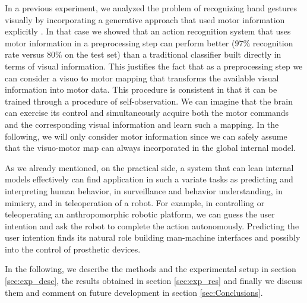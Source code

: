 In a previous experiment, we analyzed the problem of recognizing hand gestures visually
by incorporating a generative approach that used motor information explicitly 
\cite{lopes-05,metta-06}.
In that case we showed that an action recognition system that uses motor information in
a preprocessing step can perform better ($97\%$ recognition rate versus $80\%$ on the test
set) than a traditional classifier built directly in terms of visual information. This 
justifies the fact that as a preprocessing step we can consider a visuo to motor mapping that 
transforms the available visual information into motor data. This procedure is consistent 
in that it can be trained through a procedure of self-observation. We can imagine that 
the brain can exercise its control and simultaneously acquire both the motor commands and 
the corresponding visual information and learn such a mapping. In the following, we 
will only consider motor information since we can safely assume that the visuo-motor map
can always incorporated in the global internal model.

As we already mentioned, on the practical side, a system that can lean internal models 
effectively can find application in such a variate tasks as predicting and interpreting 
human behavior, in surveillance and behavior understanding, in mimicry, and in 
teleoperation of a robot. For example, in controlling or teleoperating an anthropomorphic 
robotic platform, we can guess the user intention and ask the robot to complete the 
action autonomously. Predicting the user intention finds its natural role building 
man-machine interfaces and possibly into the control of prosthetic devices.

In the following, we describe the methods and the experimental setup in section 
\ref{sec:exp_desc}, the results obtained in section \ref{sec:exp_res} and finally we 
discuss them and comment on future development in section \ref{sec:Conclusions}.



